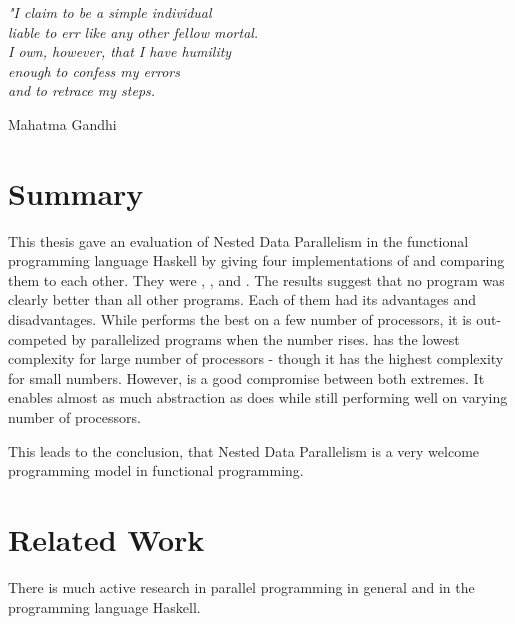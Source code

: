 

\epigraph{\emph{
"I claim to be a simple individual \\
liable to err like any other fellow mortal. \\
I own, however, that I have humility \\
enough to confess my errors \\
and to retrace my steps.
}}{
Mahatma Gandhi
}

\section{Summary}
  This thesis gave an evaluation of Nested Data Parallelism in
  the functional programming language Haskell by giving
  four implementations of \algo and comparing them to each other.
  They were \seq, \man, \ndpn and \ndpv. The results suggest
  that no program was clearly better than all
  other programs. Each of them had its advantages and disadvantages.
  While \seq performs the best on a few number of processors,
  it is out-competed by parallelized programs when the number rises.
  \man has the lowest complexity for large number
  of processors - though it has the highest complexity for small numbers.
  However, \ndpv is a good compromise between both extremes.
  It enables almost as much abstraction as does \seq
  while still performing well on varying number of processors.
  
  This leads to the conclusion, that Nested Data Parallelism is a
  very welcome programming model in functional programming.
  

\section{Related Work}
  There is much active research in parallel programming
  in general and in the programming language Haskell.
  
